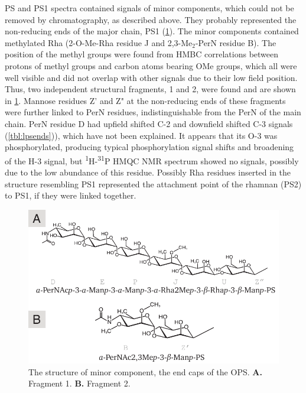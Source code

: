         \ac{PS} and \ac{PS}1 spectra contained signals of minor components, which could not be removed by
        chromatography, as described above. They probably represented the non-reducing ends of the major
        chain, \ac{PS}1 (\cref{fig:lpsends}). The minor components contained methylated Rha (2-O-Me-Rha
        residue J and 2,3-Me$_2$-PerN residue B). The position of the methyl groups were found from
        \ac{HMBC} correlations between protons of methyl groups and carbon atoms bearing OMe groups, which
        all were well visible and did not overlap with other signals due to their low field
        position. Thus, two independent structural fragments, 1 and 2, were found and are shown in
        \cref{fig:lpsends}. Mannose residues Z' and Z" at the non-reducing ends of these fragments were
        further linked to PerN residues, indistinguishable from the PerN of the main chain. PerN residue D
        had upfield shifted C-2 and downfield shifted C-3 signals (\cref{tbl:lpsends})), which have not
        been explained. It appears that its O-3 was phosphorylated, producing typical phosphorylation
        signal shifts and broadening of the H-3 signal, but \textsuperscript{1}H-\textsuperscript{31}P
        \ac{HMQC} \ac{NMR} spectrum showed no signals, possibly due to the low abundance of this
        residue. Possibly Rha residues inserted in the structure resembling \ac{PS}1 represented the
        attachment point of the rhamnan (\ac{PS}2) to \ac{PS}1, if they were linked together.

        \begin{figure}[htb]
          \begin{center}
            \includegraphics[]{lps_chapter/img/lpsends.pdf}
          \end{center}
          \caption[The structure of minor component, the end caps of the \ac{OPS}.]{The structure of minor component, the end caps of the \ac{OPS}. \textbf{A.} Fragment 1. \textbf{B.} Fragment 2.}
          \label{fig:lpsends}
        \end{figure}

